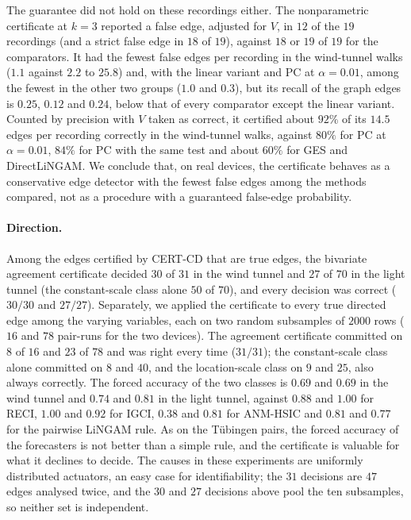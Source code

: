 The guarantee did not hold on these recordings either. The nonparametric
certificate at $k=3$ reported a false edge, adjusted for $V$, in $12$ of the $19$
recordings (and a strict false edge in $18$ of $19$), against $18$ or $19$ of $19$ for the comparators. It
had the fewest false edges per recording in the wind-tunnel walks ($1.1$ against $2.2$
to $25.8$) and, with the linear variant and PC at $\alpha=0.01$, among the fewest in the
other two groups ($1.0$ and $0.3$), but its recall of the graph edges is $0.25$, $0.12$
and $0.24$, below that of every comparator except the linear variant. Counted by precision with
$V$ taken as correct, it certified about $92\%$ of its $14.5$ edges per recording correctly in
the wind-tunnel walks, against $80\%$ for PC at $\alpha=0.01$, $84\%$ for PC with the same
test and about $60\%$ for GES and DirectLiNGAM. We conclude that, on real devices, the
certificate behaves as a conservative edge detector with the fewest false edges among the
methods compared, not as a procedure with a guaranteed false-edge probability.

\paragraph{Direction.} Among the
edges certified by CERT-CD that are true edges, the bivariate agreement
certificate decided $30$ of $31$ in the wind tunnel and $27$ of $70$ in the light
tunnel (the constant-scale class alone $50$ of $70$), and every decision was
correct ($30/30$ and $27/27$). Separately, we applied the certificate to every
true directed edge among the varying variables, each on two random subsamples of
$2000$ rows ($16$ and $78$ pair-runs for the two devices). The
agreement certificate committed on $8$ of $16$ and $23$ of $78$ and was right
every time ($31/31$); the constant-scale class alone committed on $8$ and $40$,
and the location-scale class on $9$ and $25$, also always correctly. The forced
accuracy of the two classes is $0.69$ and $0.69$ in the wind tunnel and $0.74$
and $0.81$ in the light tunnel, against $0.88$ and $1.00$ for RECI, $1.00$ and
$0.92$ for IGCI, $0.38$ and $0.81$ for ANM-HSIC and $0.81$ and $0.77$ for the
pairwise LiNGAM rule. As on the Tübingen pairs, the forced accuracy of
the forecasters is not better than a simple rule, and the certificate is
valuable for what it declines to decide. The causes in these experiments are
uniformly distributed actuators, an easy case for identifiability; the $31$
decisions are $47$ edges analysed twice, and the $30$ and $27$ decisions above pool
the ten subsamples, so neither set is independent.

